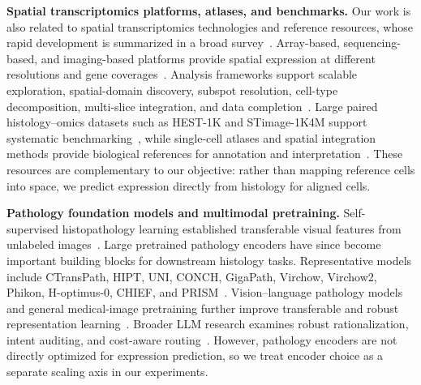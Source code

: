 \documentclass[sigconf]{acmart}
\begin{document}
\textbf{Spatial transcriptomics platforms, atlases, and benchmarks.}
Our work is also related to spatial transcriptomics technologies and reference resources, whose rapid development is summarized in a broad survey~\cite{rao2021exploring}. Array-based, sequencing-based, and imaging-based platforms provide spatial expression at different resolutions and gene coverages~\cite{stahl2016spatial,rodriques2019slideseq,stickels2021slideseqv2,vickovic2019hdst,chen2015merfish,eng2019seqfish,wang2018starmap,chen2022stereoseq,janesick2023xenium}. Analysis frameworks support scalable exploration, spatial-domain discovery, subspot resolution, cell-type decomposition, multi-slice integration, and data completion~\cite{dries2021giotto,palla2022squidpy,hu2021spagcn,zhao2021bayesspace,cable2022rctd,duan2025muse,duan2025disco}. Large paired histology--omics datasets such as HEST-1K and STimage-1K4M support systematic benchmarking~\cite{jaume2024hest,chen2024stimage}, while single-cell atlases and spatial integration methods provide biological references for annotation and interpretation~\cite{regev2017hca,cziscience2025cellxgene,sikkema2023hlca,biancalani2021tangram,kleshchevnikov2022cell2location}. These resources are complementary to our objective: rather than mapping reference cells into space, we predict expression directly from histology for aligned cells.

\textbf{Pathology foundation models and multimodal pretraining.}
Self-supervised histopathology learning established transferable visual features from unlabeled images~\cite{ciga2022contrastive}. Large pretrained pathology encoders have since become important building blocks for downstream histology tasks. Representative models include CTransPath, HIPT, UNI, CONCH, GigaPath, Virchow, Virchow2, Phikon, H-optimus-0, CHIEF, and PRISM~\cite{wang2022ctranspath,chen2022hipt,chen2024uni,lu2024conch,xu2024gigapath,vorontsov2023virchow,zimmermann2024virchow2,filiot2024phikon,saillard2024hoptimus,wang2024chief,lu2024prism}. Vision--language pathology models and general medical-image pretraining further improve transferable and robust representation learning~\cite{huang2023plip,ikezogwo2023quilt,azizi2023remedis}. Broader LLM research examines robust rationalization, intent auditing, and cost-aware routing~\cite{zhang2025text,zhang2026position,zhang2026reasoning}. However, pathology encoders are not directly optimized for expression prediction, so we treat encoder choice as a separate scaling axis in our experiments.
\end{document}
